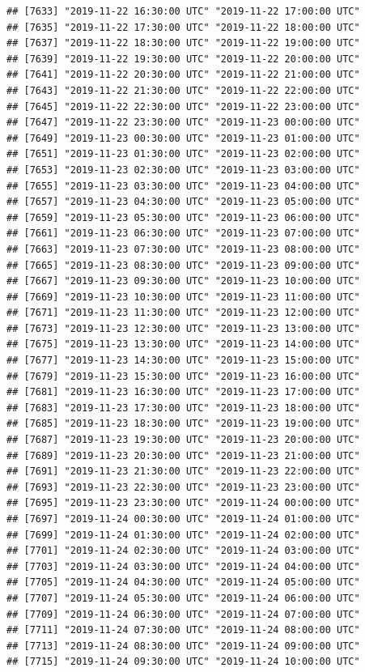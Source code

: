 \documentclass{article}\usepackage[]{graphicx}\usepackage[]{color}
\makeatletter
\newenvironment{kframe}{%
 \def\at@end@of@kframe{}%
 \ifinner\ifhmode%
  \def\at@end@of@kframe{\end{minipage}}%
  \begin{minipage}{\columnwidth}%
 \fi\fi%
 \def\FrameCommand##1{\hskip\@totalleftmargin \hskip-\fboxsep
 \colorbox{shadecolor}{##1}\hskip-\fboxsep
     \hskip-\linewidth \hskip-\@totalleftmargin \hskip\columnwidth}%
 \MakeFramed {\advance\hsize-\width
   \@totalleftmargin\z@ \linewidth\hsize
   \@setminipage}}%
 {\par\unskip\endMakeFramed%
 \at@end@of@kframe}
\newenvironment{knitrout}{}{} %
\makeatother
\begin{document}
\begin{knitrout}
\begin{kframe}
\begin{verbatim}
## [7633] "2019-11-22 16:30:00 UTC" "2019-11-22 17:00:00 UTC"
## [7635] "2019-11-22 17:30:00 UTC" "2019-11-22 18:00:00 UTC"
## [7637] "2019-11-22 18:30:00 UTC" "2019-11-22 19:00:00 UTC"
## [7639] "2019-11-22 19:30:00 UTC" "2019-11-22 20:00:00 UTC"
## [7641] "2019-11-22 20:30:00 UTC" "2019-11-22 21:00:00 UTC"
## [7643] "2019-11-22 21:30:00 UTC" "2019-11-22 22:00:00 UTC"
## [7645] "2019-11-22 22:30:00 UTC" "2019-11-22 23:00:00 UTC"
## [7647] "2019-11-22 23:30:00 UTC" "2019-11-23 00:00:00 UTC"
## [7649] "2019-11-23 00:30:00 UTC" "2019-11-23 01:00:00 UTC"
## [7651] "2019-11-23 01:30:00 UTC" "2019-11-23 02:00:00 UTC"
## [7653] "2019-11-23 02:30:00 UTC" "2019-11-23 03:00:00 UTC"
## [7655] "2019-11-23 03:30:00 UTC" "2019-11-23 04:00:00 UTC"
## [7657] "2019-11-23 04:30:00 UTC" "2019-11-23 05:00:00 UTC"
## [7659] "2019-11-23 05:30:00 UTC" "2019-11-23 06:00:00 UTC"
## [7661] "2019-11-23 06:30:00 UTC" "2019-11-23 07:00:00 UTC"
## [7663] "2019-11-23 07:30:00 UTC" "2019-11-23 08:00:00 UTC"
## [7665] "2019-11-23 08:30:00 UTC" "2019-11-23 09:00:00 UTC"
## [7667] "2019-11-23 09:30:00 UTC" "2019-11-23 10:00:00 UTC"
## [7669] "2019-11-23 10:30:00 UTC" "2019-11-23 11:00:00 UTC"
## [7671] "2019-11-23 11:30:00 UTC" "2019-11-23 12:00:00 UTC"
## [7673] "2019-11-23 12:30:00 UTC" "2019-11-23 13:00:00 UTC"
## [7675] "2019-11-23 13:30:00 UTC" "2019-11-23 14:00:00 UTC"
## [7677] "2019-11-23 14:30:00 UTC" "2019-11-23 15:00:00 UTC"
## [7679] "2019-11-23 15:30:00 UTC" "2019-11-23 16:00:00 UTC"
## [7681] "2019-11-23 16:30:00 UTC" "2019-11-23 17:00:00 UTC"
## [7683] "2019-11-23 17:30:00 UTC" "2019-11-23 18:00:00 UTC"
## [7685] "2019-11-23 18:30:00 UTC" "2019-11-23 19:00:00 UTC"
## [7687] "2019-11-23 19:30:00 UTC" "2019-11-23 20:00:00 UTC"
## [7689] "2019-11-23 20:30:00 UTC" "2019-11-23 21:00:00 UTC"
## [7691] "2019-11-23 21:30:00 UTC" "2019-11-23 22:00:00 UTC"
## [7693] "2019-11-23 22:30:00 UTC" "2019-11-23 23:00:00 UTC"
## [7695] "2019-11-23 23:30:00 UTC" "2019-11-24 00:00:00 UTC"
## [7697] "2019-11-24 00:30:00 UTC" "2019-11-24 01:00:00 UTC"
## [7699] "2019-11-24 01:30:00 UTC" "2019-11-24 02:00:00 UTC"
## [7701] "2019-11-24 02:30:00 UTC" "2019-11-24 03:00:00 UTC"
## [7703] "2019-11-24 03:30:00 UTC" "2019-11-24 04:00:00 UTC"
## [7705] "2019-11-24 04:30:00 UTC" "2019-11-24 05:00:00 UTC"
## [7707] "2019-11-24 05:30:00 UTC" "2019-11-24 06:00:00 UTC"
## [7709] "2019-11-24 06:30:00 UTC" "2019-11-24 07:00:00 UTC"
## [7711] "2019-11-24 07:30:00 UTC" "2019-11-24 08:00:00 UTC"
## [7713] "2019-11-24 08:30:00 UTC" "2019-11-24 09:00:00 UTC"
## [7715] "2019-11-24 09:30:00 UTC" "2019-11-24 10:00:00 UTC"

\end{verbatim}
\end{kframe}
\end{knitrout}
\end{document}
